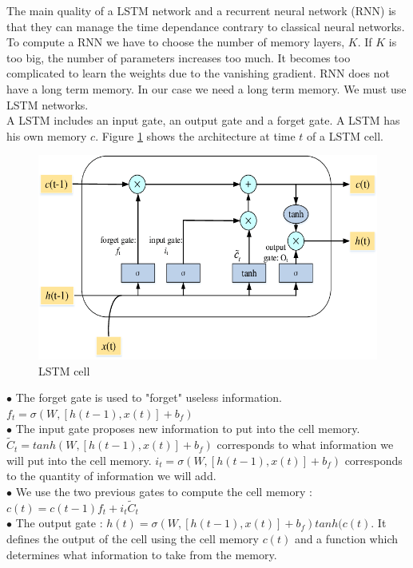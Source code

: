 The main quality of a LSTM network and a recurrent neural network (RNN) is that they can manage the time dependance contrary to classical neural networks. \\

To compute a RNN we have to choose the number of memory layers, $K$. If $K$ is too big, the number of parameters increases too much. It becomes too complicated to learn the weights due to the vanishing gradient. RNN does not have a long term memory. In our case we need a long term memory. We must use LSTM networks. \\

A LSTM includes an input gate, an output gate and a forget gate. A LSTM has his own memory $c$. Figure \ref{fig:lstm cell} shows the architecture at time $t$ of a LSTM cell.

\begin{figure}[H]
    \centering
    \includegraphics[scale = 0.4]{Graph/cellule_lstm.png}
    \caption{LSTM cell}
    \label{fig:lstm cell}
\end{figure}

$\bullet$ The forget gate is used to "forget" useless information. $f_t = \sigma(W, [h(t-1), x(t)] + b_f)$ \\
\indent $\bullet$ The input gate proposes new information to put into the cell memory. $\tilde{C}_t = tanh(W, [h(t-1), x(t)] + b_f)$ corresponds to what information we will put into the cell memory. $i_t = \sigma(W, [h(t-1), x(t)] + b_f)$ corresponds to the quantity of information we will add.\\
\indent $\bullet$ We use the two previous gates to compute the cell memory : $c(t) = c(t-1) f_t + i_t \tilde{C}_t $\\
\indent $\bullet$ The output gate : $h(t) = \sigma(W, [h(t-1), x(t)] + b_f) tanh(c(t)$. It defines the output of the cell using the cell memory $c(t)$ and a function which determines what information to take from the memory.\\


